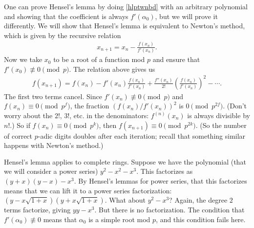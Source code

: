 \documentclass[11pt, oneside,margin=1in]{article}
\begin{document}
One can prove Hensel's lemma by doing \cref{hlptwnbd} with an arbitrary polynomial and showing that the coefficient is always $f'(\alpha_0)$, but we will prove it differently. We will show that Hensel's lemma is equivalent to Newton's method, which is given by the recursive relation
\begin{align*}
	x_{n+1} = x_n - \frac{f(x_n)}{f'(x_n)}.
\end{align*}
Now we take $x_0$ to be a root of a function mod $p$ and ensure that $f'(x_0)\not\equiv 0\pmod p$. The relation above gives us
\begin{align*}
	f(x_{n+1}) = f (x_n) - f' (x_n)  \frac{f(x_n)}{f'(x_n)} + \frac{f''(x_n)}{2!} \left( \frac{f(x_n)}{f'(x_n)} \right)^2 - \cdots.
\end{align*}
The first two terms cancel. Since $f'(x_n)\not\equiv 0 \pmod{p}$ and $f(x_n) \equiv 0 \pmod{p^f}$, the fraction $(f(x_n)/f' (x_n)) ^2$ is $0\pmod{p^{2f}}$. (Don't worry about the $2!$, $3!$, etc. in the denominators: $f^{(n)}(x_n)$ is always divisible by $n!$.) So if $f(x_n)\equiv 0\pmod{p^k}$, then $f(x_{n+1}) \equiv 0\pmod{p^{2k}}$. (So the number of correct $p$-adic digits doubles after each iteration; recall that something similar happens with Newton's method.)

Hensel's lemma applies to complete rings. Suppose we have the polynomial (that we will consider a power series) $y^2 - x^2 - x^3$. This factorizes as $(y+x) (y-x) -x^3$. By Hensel's lemmas for power series, that this factorizes means that we can lift it to a power series factorization: $(y-x\sqrt{1+x} ) (y+x\sqrt{1+x} )$. What about $y^2 - x^3$? Again, the degree $2$ terms factorize, giving $yy - x^3$. But there is no factorization. The condition that $f'(\alpha_0) \not\equiv 0$ means that $\alpha_0$ is a simple root mod $p$, and this condition fails here. 
\printindex
\end{document}
